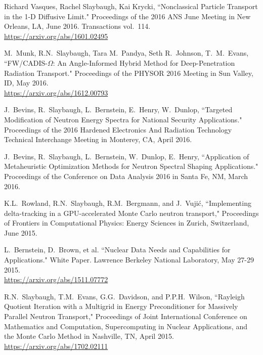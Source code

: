 \begin{bibsection}
\item Richard Vasques, Rachel Slaybaugh, Kai Krycki, ``Nonclassical Particle Transport in the 1-D Diffusive Limit." Proceedings of the 2016 ANS June Meeting in New Orleans, LA, June 2016. Transactions vol.\ 114.\\
\url{https://arxiv.org/abs/1601.02495}

\item M.\ Munk, R.N.\ Slaybaugh, Tara M.~Pandya, Seth R.~Johnson, T.~M.~Evans, ``FW/CADIS-$\Omega$: An Angle-Informed Hybrid Method for Deep-Penetration Radiation Transport." Proceedings of the PHYSOR 2016 Meeting in Sun Valley, ID, May 2016.\\
\url{https://arxiv.org/abs/1612.00793}

\item J.\ Bevins, R.\ Slaybaugh, L.\ Bernstein, E.\ Henry, W.\ Dunlop, ``Targeted Modification of Neutron Energy Spectra for National Security Applications." Proceedings of the 2016 Hardened Electronics And Radiation Technology Technical Interchange Meeting in Monterey, CA, April 2016. 

\item J.\ Bevins, R.\ Slaybaugh, L.\ Bernstein, W.\ Dunlop, E.\ Henry, ``Application of Metaheuristic Optimization Methods for Neutron Spectral Shaping Applications." Proceedings of the Conference on Data Analysis 2016 in Santa Fe, NM, March 2016. 

\item K.L.\ Rowland, R.N.\ Slaybaugh, R.M.\ Bergmann, and J.\ Vuji\'c, ``Implementing delta-tracking in a GPU-accelerated Monte Carlo neutron transport," Proceedings of Frontiers in Computational Physics: Energy Sciences in Zurich, Switzerland, June 2015. 

\item L.\ Bernstein, D.\ Brown, et al. ``Nuclear Data Needs and Capabilities for Applications." White Paper. Lawrence Berkeley National Laboratory, May 27-29 2015. \\
\url{https://arxiv.org/abs/1511.07772}

\item  R.N.\ Slaybaugh, T.M.\ Evans, G.G.\ Davidson, and P.P.H.\ Wilson, ``Rayleigh Quotient Iteration with a Multigrid in Energy Preconditioner for Massively Parallel Neutron Transport," Proceedings of Joint International Conference on Mathematics and Computation, Supercomputing in Nuclear Applications, and the Monte Carlo Method in Nashville, TN, April 2015.\\
\url{https://arxiv.org/abs/1702.02111}


\end{bibsection}
